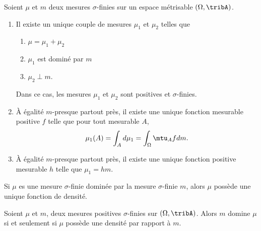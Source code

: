 \begin{theorem}
    Soient \( \mu\) et \( m\) deux mesures \( \sigma\)-finies sur un espace métrisable \( (\Omega,\tribA)\).
    \begin{enumerate}
        \item
            Il existe un unique couple de mesures \( \mu_1\) et \( \mu_2\) telles que
            \begin{enumerate}
                \item
                    \( \mu=\mu_1+\mu_2\)
                \item
                    \( \mu_1\) est dominé par \( m\)
                \item
                    \( \mu_2\perp m\).
            \end{enumerate}
            Dans ce cas, les mesures \( \mu_1\) et \( \mu_2\) sont positives et \( \sigma\)-finies.
        \item
            À égalité \(  m\)-presque partout près, il existe une unique fonction mesurable positive \( f\) telle que pour tout mesurable \( A\),
            \begin{equation}
                \mu_1(A)=\int_Ad\mu_1=\int_{\Omega}\mtu_Afd m.
            \end{equation}
        \item
            À égalité \( m\)-presque partout près, il existe une unique fonction positive mesurable \( h\) telle que \( \mu_1=hm\).
    \end{enumerate}
\end{theorem}

\begin{corollary}   \label{CorZDkhwS}
    Si \( \mu\) es une mesure \( \sigma\)-finie dominée par la mesure \( \sigma\)-finie \( m\), alors \( \mu\) possède une unique fonction de densité.
\end{corollary}

\begin{corollary}       \label{CorDomDens}
    Soient \( \mu\) et \( m\), deux mesures positives \( \sigma\)-finies sur \( (\Omega,\tribA)\). Alors \( m\) domine \( \mu\) si et seulement si \( \mu\) possède une densité par rapport à \( m\).
\end{corollary}
 
